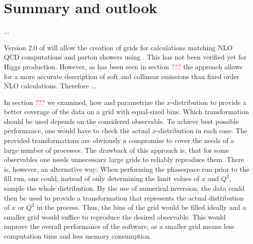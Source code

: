 
\chapter{Summary and outlook}
... 

Version 2.0 of \mcgrid{} will allow the creation of grids for calculations matching NLO QCD computations and parton showers using \mcatnlo{}.
This has not been verified yet for Higgs production.
However, as has been seen in section \textcolor{red}{???} the \mcatnlo{} approach allows for a more accurate description  of soft and collinear emissions than fixed order NLO calculations.
Therefore ...


In section \textcolor{red}{???} we examined, how \appl{} and \fnlo{} parametrize the $x$-distribution to provide a better coverage of the data on a grid with equal-sized bins.
Which transformation should be used depends on the considered observable.
To achieve best possible performance, one would have to check the actual $x$-distribution in each case.
The provided transformations are obviously a compromise to cover the needs of a large number of processes.
The drawback of this approach is, that for some observables one needs unnecessary large grids to reliably reproduce them.
There is, however, an alternative way: When performing the phasespace run prior to the fill run, one could, instead of only determining the limit values of $x$ and $Q^2$, sample the whole distribution.
By the use of numerical inversion, the data could then be used to provide a transformation that represents the actual distribution of $x$ or $Q^2$ in the process.
Thus, the bins of the grid would be filled ideally and a smaller grid would suffice to reproduce the desired observable.
This would improve the overall performance of the software, as a smaller grid means less computation time and less memory consumption.
